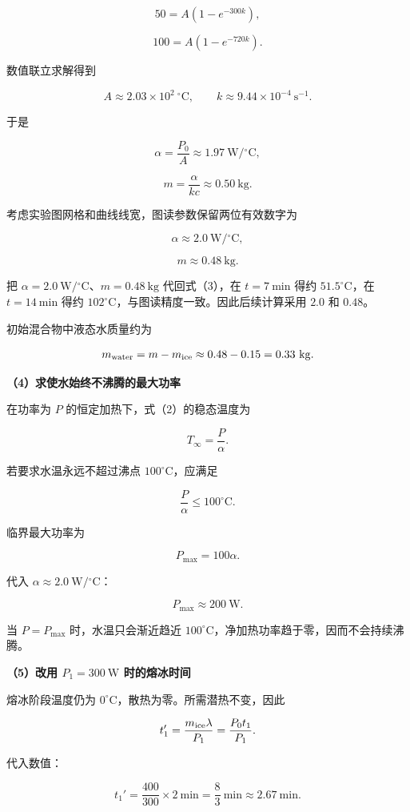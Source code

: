 \documentclass[12pt,a4paper,UTF8]{ctexart}
\begin{document}
\[
50=A(1-e^{-300k}),
\tag{5}
\]

\[
100=A(1-e^{-720k}).
\tag{6}
\]

数值联立求解得到

\[
A\approx2.03\times10^2\ ^\circ\mathrm C,
\qquad
k\approx9.44\times10^{-4}\ \mathrm{s^{-1}}.
\]

于是

\[
\alpha=\frac{P_0}{A}
\approx1.97\ \mathrm{W/{}^\circ C},
\]

\[
m=\frac{\alpha}{kc}
\approx0.50\ \mathrm{kg}.
\]

考虑实验图网格和曲线线宽，图读参数保留两位有效数字为

\[
\boxed{\alpha\approx2.0\ \mathrm{W/{}^\circ C}},
\tag{7}
\]

\[
\boxed{m\approx0.48\ \mathrm{kg}}.
\tag{8}
\]

把 \(\alpha=2.0\ \mathrm{W/{}^\circ C}\)、\(m=0.48\ \mathrm{kg}\)
代回式（3），在 \(t=7\ \mathrm{min}\) 得约 \(51.5^\circ\mathrm C\)，在
\(t=14\ \mathrm{min}\) 得约
\(102^\circ\mathrm C\)，与图读精度一致。因此后续计算采用 \(2.0\) 和
\(0.48\)。

初始混合物中液态水质量约为

\[
m_{\rm water}=m-m_{\rm ice}
\approx0.48-0.15
=0.33\ \mathrm{kg}.
\]

\textbf{（4）求使水始终不沸腾的最大功率}

在功率为 \(P\) 的恒定加热下，式（2）的稳态温度为

\[
T_\infty=\frac P\alpha.
\]

若要求水温永远不超过沸点 \(100^\circ\mathrm C\)，应满足

\[
\frac P\alpha\leq100^\circ\mathrm C.
\]

临界最大功率为

\[
P_{\max}=100\alpha.
\]

代入 \(\alpha\approx2.0\ \mathrm{W/{}^\circ C}\)：

\[
\boxed{P_{\max}\approx200\ \mathrm W}.
\tag{9}
\]

当 \(P=P_{\max}\) 时，水温只会渐近趋近
\(100^\circ\mathrm C\)，净加热功率趋于零，因而不会持续沸腾。

\textbf{（5）改用 \(P_1=300\ \mathrm W\) 时的熔冰时间}

熔冰阶段温度仍为 \(0^\circ\mathrm C\)，散热为零。所需潜热不变，因此

\[
t_1'
=\frac{m_{\rm ice}\lambda}{P_1}
=\frac{P_0t_1}{P_1}.
\]

代入数值：

\[
t_1'
=\frac{400}{300}\times2\ \mathrm{min}
=\frac83\ \mathrm{min}
\approx2.67\ \mathrm{min}.
\tag{10}
\]
\end{document}
